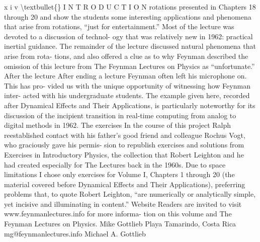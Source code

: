 \documentclass[10pt,oneside]{article}
\begin{document}
x i v \textbackslash{}textbullet\{\} I N T R O D U C T I O N rotations presented in Chapters 18 through 20 and show the students some interesting applications and phenomena that arise from rotations, “just for entertainment.” Most of the lecture was devoted to a discussion of technol- ogy that was relatively new in 1962: practical inertial guidance. The remainder of the lecture discussed natural phenomena that arise from rota- tions, and also offered a clue as to why Feynman described the omission of this lecture from The Feynman Lectures on Physics as “unfortunate.” After the lecture After ending a lecture Feynman often left his microphone on. This has pro- vided us with the unique opportunity of witnessing how Feynman inter- acted with his undergraduate students. The example given here, recorded after Dynamical Effects and Their Applications, is particularly noteworthy for its discussion of the incipient transition in real-time computing from analog to digital methods in 1962. The exercises In the course of this project Ralph reestablished contact with his father’s good friend and colleague Rochus Vogt, who graciously gave his permis- sion to republish exercises and solutions from Exercises in Introductory Physics, the collection that Robert Leighton and he had created especially for The Lectures back in the 1960s. Due to space limitations I chose only exercises for Volume I, Chapters 1 through 20 (the material covered before Dynamical Effects and Their Applications), preferring problems that, to quote Robert Leighton, “are numerically or analytically simple, yet incisive and illuminating in content.” Website Readers are invited to visit www.feynmanlectures.info for more informa- tion on this volume and The Feynman Lectures on Physics. Mike Gottlieb Playa Tamarindo, Costa Rica mg@feynmanlectures.info Michael A. Gottlieb\par

\clearpage
{}
\end{document}
